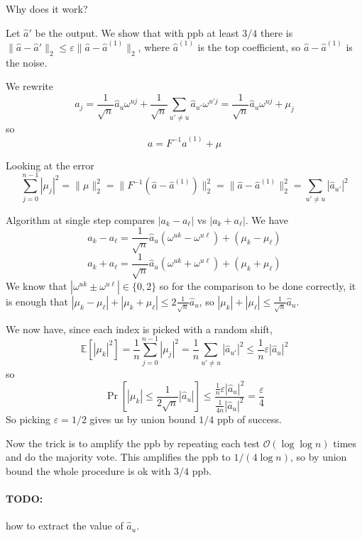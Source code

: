 \documentclass[11pt]{article}
\newcommand{\E}{{\mathbb E}}
\newcommand{\bigo}{\mathcal{O}}
\begin{document}
Why does it work?

Let $\hat{a}'$ be the output. We show that with ppb at least $3/4$ there is $\|\hat{a} - \hat{a}'\|_2 \le \varepsilon \|\hat{a} - \hat{a}^{(1)}\|_2$, where $\hat{a}^{(1)}$ is the top coefficient, so $\hat{a} - \hat{a}^{(1)}$ is the noise.

We rewrite 
$$a_j = \frac{1}{\sqrt{n}}\hat{a}_u \omega^{uj} +  \frac{1}{\sqrt{n}}\sum_{u' \not= u} \hat{a}_{u'} \omega^{u'j} =   \frac{1}{\sqrt{n}}\hat{a}_u \omega^{uj} + \mu_j$$
so
$$a = F^{-1}\hat{a}^{(1)} + \mu$$

Looking at the error
$$\sum_{j=0}^{n-1} |\mu_j|^2 = \|\mu\|_2^2 = \|F^{-1}(\hat{a} - \hat{a}^{(1)})\|_2^2 = \| \hat{a} - \hat{a}^{(1)}\|_2^2 = \sum_{u' \not= u} |\hat{a}_{u'}|^2$$

Algorithm at single step compares $|a_{k} - a_{\ell}|$ vs $|a_{k} + a_\ell|$.
We have
$$a_k - a_\ell = \frac{1}{\sqrt{n}}\hat{a}_u(\omega^{uk} - \omega^{u\ell}) + (\mu_{k} - \mu_{\ell})$$
$$a_k + a_\ell = \frac{1}{\sqrt{n}}\hat{a}_u(\omega^{uk} + \omega^{u\ell}) + (\mu_{k} + \mu_{\ell})$$
We know that $|\omega^{uk} \pm \omega^{u\ell}| \in \{0,2\}$ so for the comparison to be done correctly, it is enough that $|\mu_k - \mu_\ell| + |\mu_k + \mu_\ell| \le 2 \frac{1}{\sqrt{n}} \hat{a}_u$, so $|\mu_k| + |\mu_\ell| \le \frac{1}{\sqrt{n}}\hat{a}_u$. 

We now have, since each index is picked with a random shift,
$$\E[|\mu_k|^2]  = \frac{1}{n} \sum_{j=0}^{n-1} |\mu_j|^2 = \frac{1}{n} \sum_{u' \not= u} |\hat{a}_{u'}|^2 \le \frac{1}{n} \varepsilon |\hat{a}_u|^2$$
so 
$$\Pr[|\mu_k| \le \frac{1}{2 \sqrt{n}} |\hat{a}_u|] \le  \frac{\frac1n \varepsilon |\hat{a}_u|^2}{\frac{1}{4n} |\hat{a}_u|^2} = \frac{\varepsilon}{4}$$
So picking $\varepsilon=1/2$ gives us by union bound $1/4$ ppb of success.

Now the trick is to amplify the ppb by repeating each test $\bigo(\log \log n)$ times and do the majority vote. This amplifies the ppb to $1/(4 \log n)$, so by union bound the whole procedure is ok with $3/4$ ppb.

\paragraph{TODO:} how to extract the value of $\hat{a}_u$.
\end{document}

